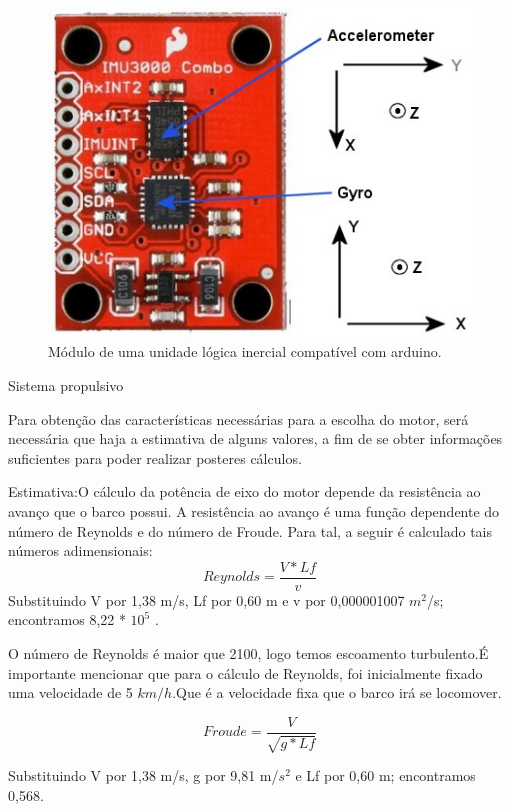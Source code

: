  \begin{figure} [!htp]
	\centering
	\includegraphics[scale=0.6]{figuras/IMU}
	\caption{Módulo de uma unidade lógica inercial compatível com arduino.}
	\label{IMU}
\end{figure}
\FloatBarrier


Sistema propulsivo 


Para obtenção das características necessárias para a escolha do motor, será necessária que haja a estimativa de alguns valores, a fim de se obter informações suficientes para poder realizar posteres cálculos.


Estimativa:O cálculo da potência de eixo do motor depende da resistência ao avanço que o barco possui. A resistência ao avanço é uma função dependente do número de Reynolds e do número de Froude. Para tal, a seguir é calculado tais números adimensionais:
\begin{equation}\label{Reynolds}
Reynolds = \frac{V * Lf}{v} 
\end{equation}
Substituindo V por 1,38 m/s, Lf por 0,60 m e v por 0,000001007 $m^2$/s; encontramos 8,22 * $10^5$ .

 
O número de Reynolds é maior que 2100, logo temos escoamento turbulento.É importante mencionar que para o cálculo de Reynolds, foi inicialmente fixado uma velocidade de 5 $km/h$.Que é a velocidade fixa que o barco irá se locomover.

\begin{equation}\label{Froude}
	Froude = \frac{V}{\sqrt{g * Lf} }
\end{equation}

Substituindo V por 1,38 m/s, g por 9,81 m/$s^2$ e Lf por  0,60 m; encontramos 0,568.

